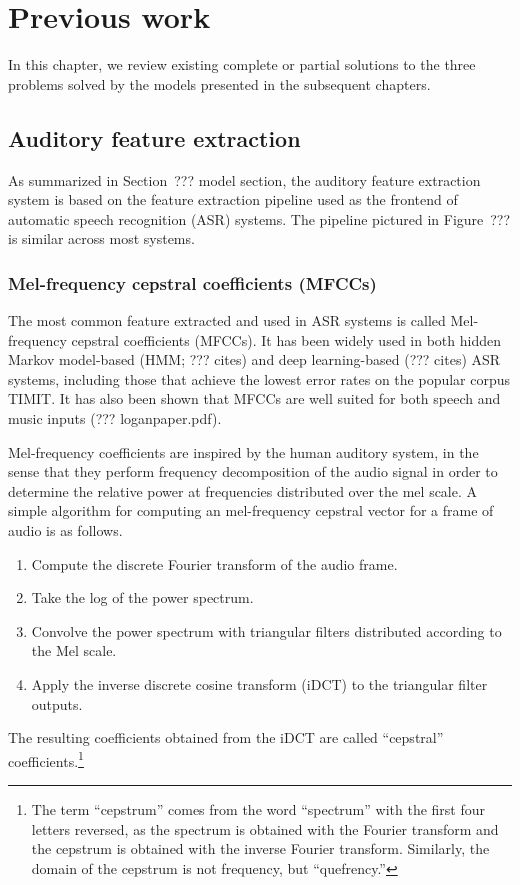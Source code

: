 \chapter{Previous work}

In this chapter, we review
existing complete or partial solutions
to the three problems
solved by the models
presented in the subsequent chapters.

\section{Auditory feature extraction}

As summarized in Section~??? model section,
the auditory feature extraction system
is based on the feature extraction pipeline
used as the frontend
of automatic speech recognition (ASR) systems.
The pipeline pictured in Figure~???
is similar across most systems.

\subsection{Mel-frequency cepstral coefficients (MFCCs)}

The most common feature extracted
and used in ASR systems
is called Mel-frequency cepstral coefficients (MFCCs).
It has been widely used
in both hidden Markov model-based (HMM; ??? cites)
and deep learning-based
(??? cites) ASR systems,
including those that achieve
the lowest error rates
on the popular corpus TIMIT.
It has also been shown that
MFCCs are well suited
for both speech and music inputs
(??? loganpaper.pdf).

Mel-frequency coefficients are inspired
by the human auditory system,
in the sense that they perform
frequency decomposition
of the audio signal
in order to determine the relative power
at frequencies distributed over the mel scale.
A simple algorithm for computing an
mel-frequency cepstral vector
for a frame of audio is as follows.

\begin{enumerate}
  \item Compute the discrete Fourier transform
    of the audio frame.
  \item Take the log of the power spectrum.
  \item Convolve the power spectrum
    with triangular filters distributed
    according to the Mel scale.
  \item Apply the inverse discrete cosine transform (iDCT)
    to the triangular filter outputs.
\end{enumerate}
The resulting coefficients obtained from
the iDCT are called ``cepstral'' coefficients.\footnote{
  The term ``cepstrum'' comes from
  the word ``spectrum'' with the first four letters reversed,
  as the spectrum is obtained with the Fourier transform
  and the cepstrum is obtained with the inverse Fourier transform.
  Similarly, the domain of the cepstrum is not frequency,
  but ``quefrency.''}

